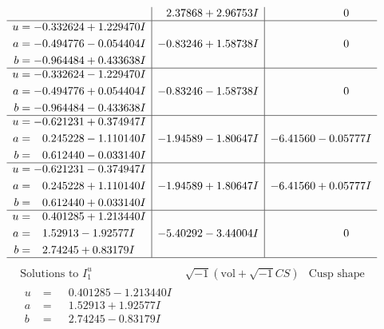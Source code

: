 \documentclass[1p]{elsarticle_modified}
\theoremstyle{definition}
\newcommand{\I}{\sqrt{-1}}
\begin{document}
$$\begin{array}{c|c|c}
 & \phantom{-}2.37868 + 2.96753 I & \phantom{-0.000000 } 0 \\ \hline\begin{aligned}
u &= -0.332624 + 1.229470 I \\
a &= -0.494776 - 0.054404 I \\
b &= -0.964484 + 0.433638 I\end{aligned}
 & -0.83246 + 1.58738 I & \phantom{-0.000000 } 0 \\ \hline\begin{aligned}
u &= -0.332624 - 1.229470 I \\
a &= -0.494776 + 0.054404 I \\
b &= -0.964484 - 0.433638 I\end{aligned}
 & -0.83246 - 1.58738 I & \phantom{-0.000000 } 0 \\ \hline\begin{aligned}
u &= -0.621231 + 0.374947 I \\
a &= \phantom{-}0.245228 - 1.110140 I \\
b &= \phantom{-}0.612440 - 0.033140 I\end{aligned}
 & -1.94589 - 1.80647 I & -6.41560 - 0.05777 I \\ \hline\begin{aligned}
u &= -0.621231 - 0.374947 I \\
a &= \phantom{-}0.245228 + 1.110140 I \\
b &= \phantom{-}0.612440 + 0.033140 I\end{aligned}
 & -1.94589 + 1.80647 I & -6.41560 + 0.05777 I \\ \hline\begin{aligned}
u &= \phantom{-}0.401285 + 1.213440 I \\
a &= \phantom{-}1.52913 - 1.92577 I \\
b &= \phantom{-}2.74245 + 0.83179 I\end{aligned}
 & -5.40292 - 3.44004 I & \phantom{-0.000000 } 0\\
 \hline 
 \end{array}$$\newpage$$\begin{array}{c|c|c}  
\text{Solutions to }I^u_{1}& \I (\text{vol} + \sqrt{-1}CS) & \text{Cusp shape}\\
 \hline 
\begin{aligned}
u &= \phantom{-}0.401285 - 1.213440 I \\
a &= \phantom{-}1.52913 + 1.92577 I \\
b &= \phantom{-}2.74245 - 0.83179 I\end{aligned}

\end{array}$$
\end{document}
